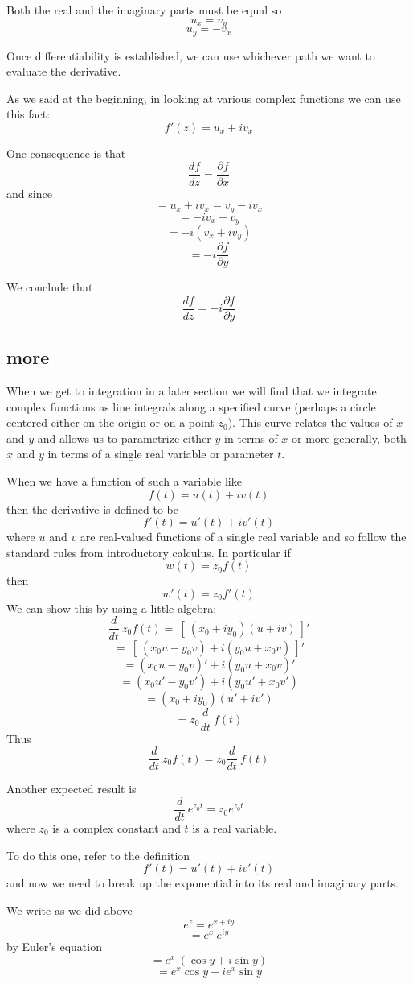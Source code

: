 \documentclass[11pt, oneside]{article}
\begin{document}
Both the real and the imaginary parts must be equal so
\[ u_x  = v_y \]
\[ u_y = - v_x \]

Once differentiability is established, we can use whichever path we want to evaluate the derivative.

As we said at the beginning, in looking at various complex functions we can use this fact:
\[ f'(z) = u_x + i v_x \]

One consequence is that
\[ \frac{df}{dz} = \frac{\partial f}{\partial x} \]
and since
\[ = u_x + i v_x = v_y - i v_x \]
\[ = - i v_x + v_y \]
\[ = -i (v_x + i v_y) \]
\[ = -i \frac{\partial f}{\partial y} \]

We conclude that 
\[ \frac{df}{dz} = -i \frac{\partial f}{\partial y} \]

\subsection*{more}
When we get to integration in a later section we will find that we integrate complex functions as line integrals along a specified curve (perhaps a circle centered either on the origin or on a point $z_0$).  This curve relates the values of $x$ and $y$ and allows us to parametrize either $y$ in terms of $x$ or more generally, both $x$ and $y$ in terms of a single real variable or parameter $t$.

When we have a function of such a variable like
\[ f(t) = u(t) + i v(t) \]
then the derivative is defined to be
\[ f'(t) = u'(t) + i v'(t) \]
where $u$ and $v$ are real-valued functions of a single real variable and so follow the standard rules from introductory calculus.  In particular if
\[ w(t) = z_0 f(t) \]
then
\[ w'(t) = z_0 f'(t) \]
We can show this by using a little algebra:
\[ \frac{d}{dt} \ z_0 f(t) = \ [ \ (x_0 + i y_0) (u + iv) \ ]' \]
\[ = \ [ \ (x_0 u - y_0 v) + i (y_0 u + x_0 v) \ ]' \]
\[ = (x_0 u - y_0 v)' + i (y_0 u + x_0 v)' \]
\[ = (x_0 u' - y_0 v') + i (y_0 u' + x_0 v') \]
\[ = (x_0 + i y_0)(u' + iv') \]
\[ = z_0 \frac{d}{dt} \ f(t) \]
Thus
\[ \frac{d}{dt} \ z_0 f(t) = z_0 \frac{d}{dt} \ f(t) \]

Another expected result is
\[ \frac{d}{dt} \ e^{z_0 t} = z_0 e^{z_0 t} \]
where $z_0$ is a complex constant and $t$ is a real variable.

To do this one, refer to the definition
\[ f'(t) = u'(t) + i v'(t) \]
and now we need to break up the exponential into its real and imaginary parts.  

We write as we did above
\[ e^z = e^{x + iy} \]
\[ = e^x \ e^{iy} \]
by Euler's equation
\[ = e^x \ (\cos y + i \sin y) \]
\[ = e^x \cos y + i e^x \sin y \]
\end{document}
